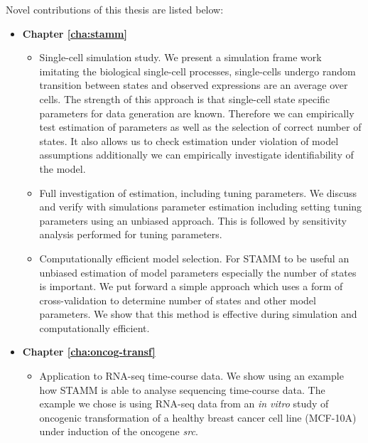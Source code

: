 \vspace{1cm}
\noindent Novel contributions of this thesis are listed below:
\begin{itemize}
\item {\bf Chapter \ref{cha:stamm}}
\begin{itemize}
\item Single-cell simulation study. We present a simulation frame work imitating the biological single-cell processes, single-cells undergo random transition between states and observed expressions are an average over cells. The strength of this approach is that single-cell state specific parameters for data generation are known. Therefore we can empirically test estimation of parameters as well as the selection of correct number of states. It also allows us to check estimation under violation of model assumptions additionally we can empirically investigate identifiability of the model.

\item Full investigation of estimation, including tuning parameters. We discuss and verify with simulations parameter estimation including setting tuning parameters using an unbiased approach. This is followed by sensitivity analysis performed for tuning parameters. 

\item Computationally efficient model selection. For STAMM to be useful an unbiased estimation of model parameters especially the number of states is important. We put forward a simple approach which uses a form of cross-validation to determine number of states and other model parameters. We show that this method is effective during simulation and computationally efficient. 
\end{itemize}

\item {\bf Chapter \ref{cha:oncog-transf}}

\begin{itemize}
\item Application to RNA-seq time-course data. 
We show using an example how STAMM is able to analyse sequencing time-course data. The example we chose is using RNA-seq data from an {\it in vitro} study of oncogenic transformation of a healthy breast cancer cell line (MCF-10A) under induction of the oncogene {\it src}.


\end{itemize}
\end{itemize}
